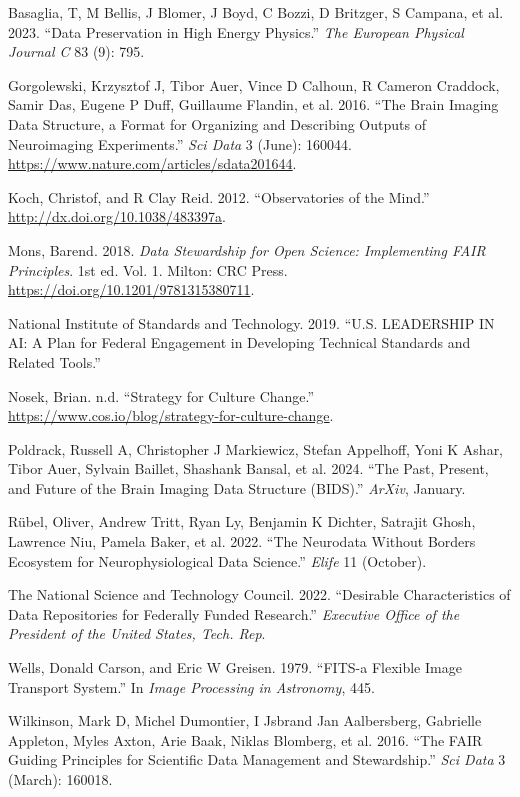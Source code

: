 \documentclass[
  letterpaper,
  DIV=11,
  numbers=noendperiod]{scrartcl}
\newlength{\cslhangindent}
\newenvironment{CSLReferences}[2] %
 {\begin{list}{}{%
  \setlength{\itemindent}{0pt}
  \setlength{\leftmargin}{0pt}
  \setlength{\parsep}{0pt}
  \ifodd #1
   \setlength{\leftmargin}{\cslhangindent}
   \setlength{\itemindent}{-1\cslhangindent}
  \fi
  \setlength{\itemsep}{#2\baselineskip}}}
 {\end{list}}
\begin{document}
\label{refs}
\begin{CSLReferences}{1}{0}
Basaglia, T, M Bellis, J Blomer, J Boyd, C Bozzi, D Britzger, S Campana,
et al. 2023. {``Data Preservation in High Energy Physics.''} \emph{The
European Physical Journal C} 83 (9): 795.

Gorgolewski, Krzysztof J, Tibor Auer, Vince D Calhoun, R Cameron
Craddock, Samir Das, Eugene P Duff, Guillaume Flandin, et al. 2016.
{``The {Brain} {Imaging} {Data} {Structure}, a Format for Organizing and
Describing Outputs of Neuroimaging Experiments.''} \emph{Sci Data} 3
(June): 160044. \url{https://www.nature.com/articles/sdata201644}.

Koch, Christof, and R Clay Reid. 2012. {``Observatories of the Mind.''}
\url{http://dx.doi.org/10.1038/483397a}.

Mons, Barend. 2018. \emph{Data Stewardship for Open Science:
Implementing FAIR Principles}. 1st ed. Vol. 1. Milton: CRC Press.
\url{https://doi.org/10.1201/9781315380711}.

National Institute of Standards and Technology. 2019. {``{U.S}.
{LEADERSHIP} {IN} {AI}: A Plan for Federal Engagement in Developing
Technical Standards and Related Tools.''}

Nosek, Brian. n.d. {``Strategy for Culture Change.''}
\url{https://www.cos.io/blog/strategy-for-culture-change}.

Poldrack, Russell A, Christopher J Markiewicz, Stefan Appelhoff, Yoni K
Ashar, Tibor Auer, Sylvain Baillet, Shashank Bansal, et al. 2024. {``The
Past, Present, and Future of the Brain Imaging Data Structure
({BIDS}).''} \emph{ArXiv}, January.

Rübel, Oliver, Andrew Tritt, Ryan Ly, Benjamin K Dichter, Satrajit
Ghosh, Lawrence Niu, Pamela Baker, et al. 2022. {``The Neurodata Without
Borders Ecosystem for Neurophysiological Data Science.''} \emph{Elife}
11 (October).

The National Science and Technology Council. 2022. {``Desirable
Characteristics of Data Repositories for Federally Funded Research.''}
\emph{Executive Office of the President of the United States, Tech.
Rep}.

Wells, Donald Carson, and Eric W Greisen. 1979. {``FITS-a Flexible Image
Transport System.''} In \emph{Image Processing in Astronomy}, 445.

Wilkinson, Mark D, Michel Dumontier, I Jsbrand Jan Aalbersberg,
Gabrielle Appleton, Myles Axton, Arie Baak, Niklas Blomberg, et al.
2016. {``The {FAIR} Guiding Principles for Scientific Data Management
and Stewardship.''} \emph{Sci Data} 3 (March): 160018.

\end{CSLReferences}
\end{document}
